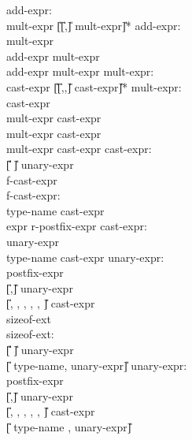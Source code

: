 \begin{center}
\PAIR
{
add-expr: \\
\>	mult-expr \U{[}\U{[}\T{+},\T{-}\U{]} mult-expr\U{]}*
}
{
add-expr: \\
\>	mult-expr\\
\>	add-expr \T{+} mult-expr\\
\>	add-expr \T{-} mult-expr
}
\PAIR
{
mult-expr:\\
\>	cast-expr \U{[}\U{[}\T{*},\T{/},\T{\%}\U{]} cast-expr\U{]}*
}
{
mult-expr:\\
\>	cast-expr\\
\>	mult-expr \T{*} cast-expr\\
\>	mult-expr \T{/} cast-expr\\
\>	mult-expr \T{\%} cast-expr
}
\PAIR
{
cast-expr:\\
\>	\U{[}\U{\circumflex} \T{(}\U{]}  unary-expr\\
\>	\T{(} f-cast-expr \\
f-cast-expr:\\
\>	type-name \T{)} cast-expr\\
\>	expr \T{)} r-postfix-expr
}
{
cast-expr:\\
\>	unary-expr\\
\>	\T{(} type-name \T{)} cast-expr	
}
\PAIR
{
unary-expr:\\
\>	postfix-expr\\
\>	\U{[}\T{++},\T{--}\U{]}  unary-expr\\
\>	\U{[}\T{\&}, \T{*}, \T{+}, \T{-}, \T{\~{}}, \T{!}\U{]}  cast-expr\\
\>	 sizeof-ext\\
sizeof-ext:\\
\>	\U{[}\U{\circumflex} \T{(}\U{]}  unary-expr\\
\>      \T{(} \U{[} type-name, unary-expr\U{]} \T{)}
}
{
unary-expr:\\
\>	postfix-expr\\
\>	\U{[}\T{++},\T{--}\U{]}  unary-expr\\
\>	\U{[}\T{\&}, \T{*}, \T{+}, \T{-}, \T{\~{}}, \T{!}\U{]} cast-expr\\
\>	 \U{[}\T{(} type-name \T{)}, unary-expr\U{]}
}


\end{center}
